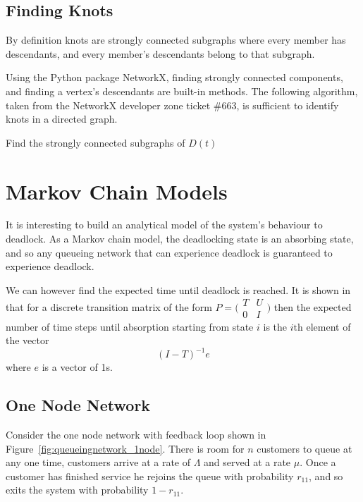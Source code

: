 \documentclass{article}
\begin{document}
\subsection{Finding Knots}

By definition knots are strongly connected subgraphs where every member has descendants, and every member's descendants belong to that subgraph.

Using the Python package NetworkX, finding strongly connected components, and finding a vertex's descendants are built-in methods.
The following algorithm, taken from the NetworkX developer zone ticket \#663, is sufficient to identify knots in a directed graph.

\begin{algorithm}[H]
    \DontPrintSemicolon
    Find the strongly connected subgraphs of $D(t)$\;
    \;
\end{algorithm}



\section{Markov Chain Models}\label{sec:markovmodels}

It is interesting to build an analytical model of the system's behaviour to deadlock.
As a Markov chain model, the deadlocking state is an absorbing state, and so any queueing network that can experience deadlock is guaranteed to experience deadlock.

We can however find the expected time until deadlock is reached.
It is shown in \cite{stewart09} that for a discrete transition matrix of the form $P = \bigl(\begin{smallmatrix} T & U\\ 0 & I \end{smallmatrix} \bigr)$ then the expected number of time steps until absorption starting from state $i$ is the $i\text{th}$ element of the vector
\begin{equation}
  (I - T)^{-1}e
\end{equation}
where $e$ is a vector of 1s.

\subsection{One Node Network}\label{sec:1nodenet}
Consider the one node network with feedback loop shown in Figure~\ref{fig:queueingnetwork_1node}.
There is room for $n$ customers to queue at any one time, customers arrive at a rate of $\Lambda$ and served at a rate $\mu$.
Once a customer has finished service he rejoins the queue with probability $r_{11}$, and so exits the system with probability $1 - r_{11}$.
\end{document}
